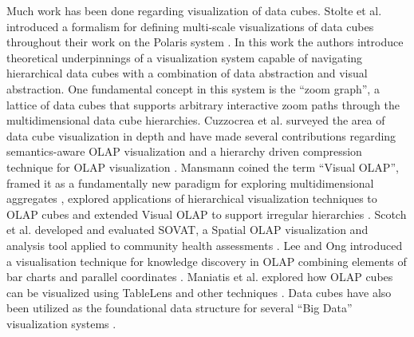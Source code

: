 \documentclass[12pt]{article}
\begin{document}
\begin{doublespace}
Much work has been done regarding visualization of data cubes. Stolte et al. introduced a formalism for defining multi-scale visualizations of data cubes throughout their work on the Polaris system \cite{stolte2003multiscale} \cite{stolte2002query} \cite{stolte2002polaris}. In this work the authors introduce theoretical underpinnings of a visualization system capable of navigating hierarchical data cubes with a combination of data abstraction and visual abstraction. One fundamental concept in this system is the ``zoom graph'', a lattice of data cubes that supports arbitrary interactive zoom paths through the multidimensional data cube hierarchies. Cuzzocrea et al. surveyed the area of data cube visualization in depth \cite{cuzzocrea2009olap} and have made several contributions regarding semantics-aware OLAP visualization \cite{cuzzocrea2007semantics} and a hierarchy driven compression technique for OLAP visualization \cite{cuzzocrea2006hierarchy}. Mansmann coined the term ``Visual OLAP'', framed it as a fundamentally new paradigm for exploring multidimensional aggregates \cite{mansmann2008visual}, explored applications of hierarchical visualization techniques to OLAP cubes \cite{mansmann2007exploring} and extended Visual OLAP to support irregular hierarchies \cite{mansmann2006extending}. Scotch et al. developed and evaluated SOVAT, a Spatial OLAP visualization and analysis tool applied to community health assessments \cite{scotch2005sovat} \cite{scotch2007usability}. Lee and Ong introduced a visualisation technique for knowledge discovery in OLAP combining elements of bar charts and parallel coordinates \cite{lee1995new}. Maniatis et al. explored how OLAP cubes can be visualized using TableLens and other techniques \cite{maniatis2003advanced}. Data cubes have also been utilized as the foundational data structure for several ``Big Data'' visualization systems \cite{lins2013nanocubes} \cite{liu2013immens}.


\end{doublespace}
\end{document}
